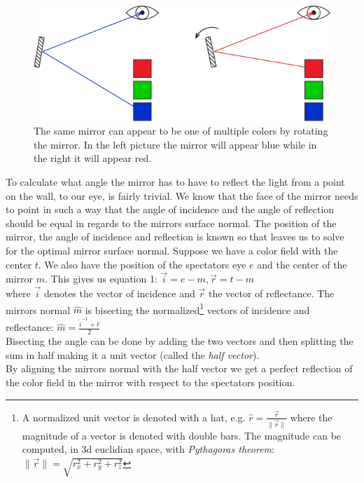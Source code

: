 \documentclass{article}
\begin{document}
\begin{figure}[ht!]
\centering
\includegraphics{images/change-color.png}
\caption{The same mirror can appear to be one of multiple colors by rotating the mirror. In the left picture the mirror will appear blue while in the right it will appear red.}
\end{figure}


To calculate what angle the mirror has to have to reflect the light from
a point on the wall, to our eye, is fairly trivial. We
know that the face of the mirror needs to point in such a way that the
angle of incidence and the angle of reflection should be equal in
regards to the mirrors surface normal. The position of the mirror, the
angle of incidence and reflection is known so that leaves us to solve for 
the optimal mirror surface normal. Suppose we have a color field with
the center \(t\). We also have the position of the spectators eye \(e\)
and the center of the mirror \(m\). This gives us equation 1:
\(\vec{i}=e-m, \vec{r}=t-m\)\\
where \(\vec{i}\) denotes the vector of incidence and \(\vec{r}\) the
vector of reflectance. The mirrors normal \(\hat{m}\) is bisecting the
normalized\footnote{A normalized unit vector is denoted with a hat, e.g.
  \(\hat{r}=\frac{\vec{r}}{\|\vec{r}\|}\) where the magnitude of a
  vector is denoted with double bars. The magnitude can be computed, in
  3d euclidian space, with \emph{Pythagoras theorem}:
  \(\|\vec{r}\| = \sqrt{r_x^2 + r_y^2 + r_z^2}\)} vectors of incidence
and reflectance: \(\hat{m}=\frac{\hat{i}^{-1}+\hat{r}}{2}\)\\
Bisecting the angle can be done by adding the two vectors and then
splitting the sum in half making it a unit vector (called the \emph{half
vector}).\\
By aligning the mirrors normal with the half vector we get a perfect
reflection of the color field in the mirror with respect to the
spectators position.
\end{document}
